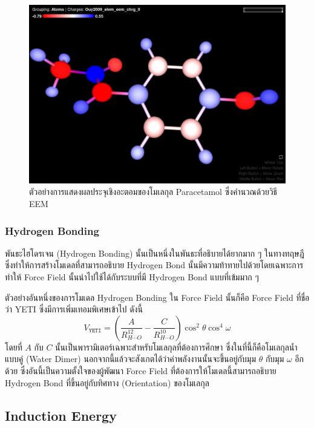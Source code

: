 \begin{figure}[H]
  \centering
  \includegraphics[width=0.8\linewidth]{fig/EEM-paracetamol.png}
  \caption{ตัวอย่างการแสดงผลประจุเชิงอะตอมของโมเลกุล Paracetamol ซึ่งคำนวณด้วยวิธี EEM}
  \label{fig:EEM_paracetamol}
\end{figure}

\subsubsection{Hydrogen Bonding}

พันธะไฮโดรเจน (Hydrogen Bonding) นั้นเป็นหนึ่งในพันธะที่อธิบายได้ยากมาก ๆ ในทางทฤษฎี ซึ่งทำให้การสร้างโมเดลที่สามารถอธิบาย Hydrogen Bond นั้นมีความท้าทายไปด้วยโดยเฉพาะการทำให้ Force Field นั้นนำไปใช้ได้กับระบบที่มี Hydrogen Bond แบบที่เข้มมาก ๆ

ตัวอย่างอันหนึ่งของการโมเดล Hydrogen Bonding ใน Force Field นั้นก็คือ Force Field ที่ชื่อว่า YETI\autocite{vedani1988} ซึ่งมีการเพิ่มเทอมพิเศษเข้าไป ดังนี้
%
\begin{equation}
  V_{\texttt{YETI}}
  =
  \left(
  \frac{A}{R^{12}_{H \cdots O}}
  - \frac{C}{R^{10}_{H \cdots O}}
  \right)
  \cos^{2} \theta
  \cos^{4} \omega
\end{equation}
%
โดยที่ $A$ กับ $C$ นั้นเป็นพารามิเตอร์เฉพาะสำหรับโมเลกุลที่ต้องการศึกษา ซึ่งในที่นี้ก็คือโมเลกุลน้ำแบบคู่ (Water Dimer) นอกจากนี้แล้วจะสังเกตได้ว่าค่าพลังงานนั้นจะขึ้นอยู่กับมุม $\theta$ กับมุม $\omega$ อีกด้วย ซึ่งอันนี้เป็นความตั้งใจของผู้พัฒนา Force Field ที่ต้องการให้โมเดลนี้สามารถอธิบาย Hydrogen Bond ที่ขึ้นอยู่กับทิศทาง (Orientation) ของโมเลกุล

\subsection{Induction Energy}

